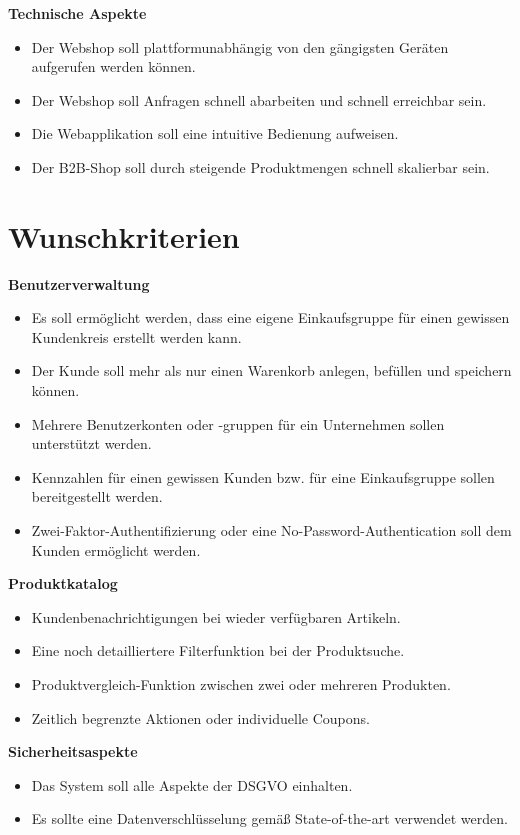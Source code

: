 \documentclass[%
	ngerman,
	12pt,
	a4paper,
	oneside,
	parskip=full
]{scrbook}
\begin{document}
	\vspace{0.5cm}
	\textbf{Technische Aspekte}
	\begin{itemize}
		\item Der Webshop soll plattformunabhängig von den gängigsten Geräten aufgerufen werden können.
		\item Der Webshop soll Anfragen schnell abarbeiten und schnell erreichbar sein.
		\item Die Webapplikation soll eine intuitive Bedienung aufweisen.
		\item Der B2B-Shop soll durch steigende Produktmengen schnell skalierbar sein.
	\end{itemize}

\section{Wunschkriterien}
	\vspace{0.5cm}
	\textbf{Benutzerverwaltung}
	\begin{itemize}
		\item Es soll ermöglicht werden, dass eine eigene Einkaufsgruppe für einen gewissen Kundenkreis erstellt werden kann.
		\item Der Kunde soll mehr als nur einen Warenkorb anlegen, befüllen und speichern können.
		\item Mehrere Benutzerkonten oder -gruppen für ein Unternehmen sollen unterstützt werden.
		\item Kennzahlen für einen gewissen Kunden bzw. für eine Einkaufsgruppe sollen bereitgestellt werden.
		\item Zwei-Faktor-Authentifizierung oder eine No-Password-Authentication soll dem Kunden ermöglicht werden.
	\end{itemize}

	\vspace{0.5cm}
	\textbf{Produktkatalog}
	\begin{itemize}
		\item Kundenbenachrichtigungen bei wieder verfügbaren Artikeln.
		\item Eine noch detailliertere Filterfunktion bei der Produktsuche.
		\item Produktvergleich-Funktion zwischen zwei oder mehreren Produkten.
		\item Zeitlich begrenzte Aktionen oder individuelle Coupons.
	\end{itemize}

	\vspace{0.5cm}
	\textbf{Sicherheitsaspekte}
	\begin{itemize}
		\item Das System soll alle Aspekte der DSGVO einhalten.
		\item Es sollte eine Datenverschlüsselung gemäß State-of-the-art verwendet werden.
	\end{itemize}
\end{document}
